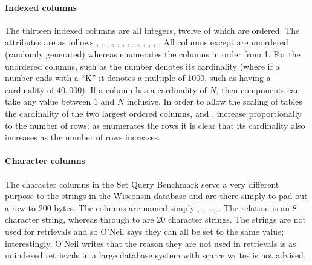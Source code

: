 \paragraph{Indexed columns} The thirteen indexed columns are all integers,
twelve of which are ordered. The attributes are as follows
, ,
, ,
, ,
, ,
, , ,
, . All columns except
 are unordered (randomly generated) whereas
 enumerates the columns in order from 1. For the
unordered columns, such as  the number denotes its
cardinality (where if a number ends with a ``K'' it denotes a multiple of 1000,
such as  having a cardinality of $40,000$). If a column
has a cardinality of $N$, then components can take any value between $1$ and
$N$ inclusive. In order to allow the scaling of tables the cardinality of the
two largest ordered columns,  and
, increase proportionally to the number of rows; as
 enumerates the rows it is clear that its
cardinality also increases as the number of rows increases.

\paragraph{Character columns} The character columns in the Set Query Benchmark
serve a very different purpose to the strings in the Wisconsin database and are
there simply to pad out a row to 200 bytes. The columns are named simply
, , \ldots, .
The relation
 is an 8 character string, whereas  through to
 are 20 character strings. The strings are not used for retrievals
and so O'Neil says they can all be set to the same value; interestingly, O'Neil
writes that the reason they are not used in retrievals is as unindexed
retrievals in a large database system with scarce writes is not advised.
